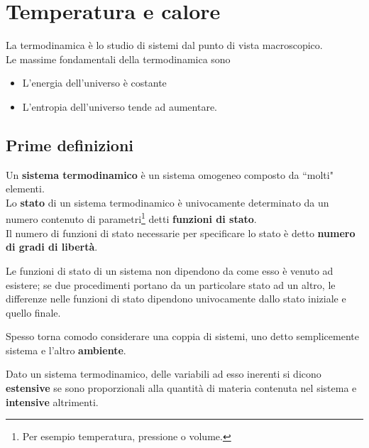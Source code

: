 \chapter{Temperatura e calore}
\noindent
La termodinamica \`e lo studio di sistemi dal punto di vista macroscopico.\\
Le massime fondamentali della termodinamica sono
\begin{itemize}
\item L'energia dell'universo \`e costante
\item L'entropia dell'universo tende ad aumentare.
\end{itemize}

\section{Prime definizioni}
\begin{definition}
Un \textbf{sistema termodinamico} \`e un sistema omogeneo composto da ``molti" elementi.\\
Lo \textbf{stato} di un sistema termodinamico \`e univocamente determinato da un numero contenuto di parametri\footnote{Per esempio temperatura, pressione o volume.} detti \textbf{funzioni di stato}.\\
Il numero di funzioni di stato necessarie per specificare lo stato \`e detto \textbf{numero di gradi di libert\`a}.
\end{definition}

\begin{remark}
Le funzioni di stato di un sistema non dipendono da come esso \`e venuto ad esistere; se due procedimenti portano da un particolare stato ad un altro, le differenze nelle funzioni di stato dipendono univocamente dallo stato iniziale e quello finale.
\end{remark}

\begin{remark}
Spesso torna comodo considerare una coppia di sistemi, uno detto semplicemente sistema e l'altro \textbf{ambiente}.
\end{remark}

\begin{definition}
Dato un sistema termodinamico, delle variabili ad esso inerenti si dicono \textbf{estensive} se sono proporzionali alla quantit\`a di materia contenuta nel sistema e \textbf{intensive} altrimenti.
\end{definition}

